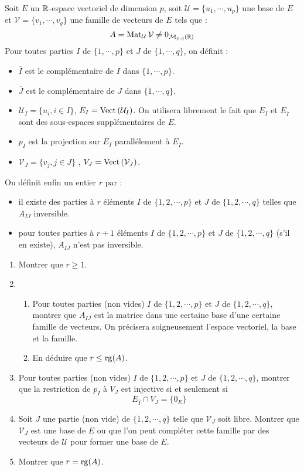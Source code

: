 Soit $E$ un $\mathbb{R}$-espace vectoriel de dimension $p$, soit $\mathcal U =\{u_1,\cdots,u_p\}$ une base de $E$ et $\mathcal V =\{v_1,\cdots,v_q\}$ une famille de vecteurs de $E$ tels que :
\begin{displaymath}
 A = \operatorname{Mat}_{\mathcal U}\mathcal V \neq 0_{\mathcal M_{p,q}(\mathbb{R})}
\end{displaymath}
Pour toutes parties $I$ de $\{1,\cdots,p\}$ et $J$ de $\{1,\cdots,q\}$, on définit :
\begin{itemize}
 \item $\overline{I}$ est le complémentaire de $I$ dans $\{1,\cdots,p\}$.
\item $\overline{J}$ est le complémentaire de $J$ dans $\{1,\cdots,q\}$.
\item $\mathcal U _I = \{u_i, i\in I\}$, $E_I = \operatorname{Vect}\left( \mathcal U_I\right)$. On utilisera librement le fait que $E_I$ et $E_{\overline{I}}$ sont des sous-espaces supplémentaires de $E$.
\item $p_I$ est la projection sur $E_I$ parallélement à $E_{\overline{I}}$.
\item $\mathcal V _J = \{v_j, j\in J\}$ , $V_J = \operatorname{Vect}\left( \mathcal V_J\right)$.
\end{itemize}
On définit enfin un entier $r$ par :
\begin{itemize}
 \item il existe des parties à $r$ éléments $I$ de $\{1,2,\cdots,p\}$ et $J$ de $\{1,2,\cdots,q\}$ telles que $A_{IJ}$ inversible.
\item pour toutes parties à $r+1$ éléments $I$ de $\{1,2,\cdots,p\}$ et $J$ de $\{1,2,\cdots,q\}$ (s'il en existe), $A_{IJ}$ n'est pas inversible.
\end{itemize}

\begin{enumerate}
 \item Montrer que $r\geq 1$.
\item \begin{enumerate}
\item Pour toutes parties (non vides) $I$ de $\{1,2,\cdots,p\}$ et $J$ de $\{1,2,\cdots,q\}$, montrer que $A_{IJ}$ est la matrice dans une certaine base d'une certaine famille de vecteurs. On précisera soigneusement l'espace vectoriel, la base et la famille.
\item En déduire que $r\leq \operatorname{rg}(A)$. 
\end{enumerate}
\item Pour toutes parties (non vides) $I$ de $\{1,2,\cdots,p\}$ et $J$ de $\{1,2,\cdots,q\}$, montrer que la restriction de $p_I$ à $V_J$ est injective si et seulement si 
\begin{displaymath}
 E_{\overline{I}} \cap V_J = \{0_E\}
\end{displaymath}
\item Soit $J$ une partie (non vide) de $\{1,2,\cdots,q\}$ telle que $\mathcal V_J$ soit libre. Montrer que $\mathcal V_J$ est une base de $E$ ou que l'on peut compléter cette famille par des vecteurs de $\mathcal U$ pour former une base de $E$.
\item Montrer que $r=\operatorname{rg}(A)$.
\end{enumerate}
